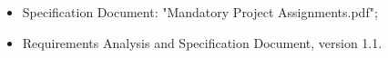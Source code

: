 \begin{itemize}
\item Specification Document: "Mandatory Project Assignments.pdf";
\item Requirements Analysis and Specification Document, version 1.1.
\end{itemize}
